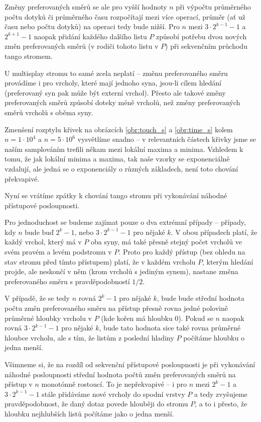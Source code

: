 Změny preferovaných směrů se ale pro vyšší hodnoty $n$ při výpočtu
průměrného počtu dotyků či průměrného času rozpočítají mezi více operací,
průměr (ať už času nebo počtu dotyků) na operaci tedy bude nižší. Pro $n$
 mezi $3\cdot 2^{k-1}-1$ a $2^{k+1}-1$ naopak přidání každého dalšího listu $P$ způsobí potřebu dvou nových změn preferovaných směrů (v rodiči tohoto listu v $P$) při sekvenčním průchodu tango stromem.

U multisplay stromu to samé zcela neplatí -- změnu preferovaného směru
provádíme i pro vrcholy, které mají jednoho syna, jsou-li cílem hledání
(preferovaný syn pak může být externí vrchol). Přesto ale takové změny
preferovaných směrů způsobí doteky méně vrcholů, než změny preferovaných směrů vrcholů s oběma syny.

Zmenšení rozptylu křivek na obrázcích \ref{obr:touch_s} a \ref{obr:time_s}
kolem $n=1\cdot 10^4$ a $n=5\cdot 10^6$ vysvětlíme snadno -- v relevantních
částech křivky jsme se naším samplováním trefili někam mezi lokální maxima a
minima. Vzhledem k tomu, že jak lokální minima a maxima, tak naše vzorky se
exponenciálně vzdalují, ale jedná se o exponenciály o různých základech, není
toto chování překvapivé.

Nyní se vrátíme zpátky k chování tango stromu při vykonávání náhodné přístupové
posloupnosti.

Pro jednoduchost se budeme zajímat pouze o dva extrémní případy --
případy, kdy $n$ bude buď $2^k-1$, nebo $3\cdot 2^{k-1} - 1$ pro nějaké $k$. V obou
případech platí, že každý vrchol, který má v $P$ oba syny, má také přesně
stejný počet vrcholů ve svém pravém a levém podstromu v $P$. Proto pro každý
přístup (bez ohledu na stav stromu před tímto přístupem) platí, že v každém
vrcholu $P$, kterým hledání projde, ale neskončí v něm (krom vrcholů s jediným
synem), nastane změna preferovaného směru s pravděpodobností $1/2$.

V případě, že se tedy $n$ rovná $2^k-1$ pro nějaké $k$, bude bude střední
hodnota počtu změn preferovaného směru na přístup přesně rovna jedné polovině
průměrné hloubky vrcholu v $P$ (kde kořen má hloubku 0). Pokud se $n$ naopak rovná
$3\cdot2^{k-1}-1$ pro nějaké $k$, bude tato hodnota sice také rovna průměrné
hloubce vrcholu, ale s tím, že listům z poslední hladiny $P$ počítáme hloubku o jedna menší.

Všimneme si, že na rozdíl od sekvenční přístupové posloupnosti je při vykonávání náhodné
posloupnosti střední hodnota počtů změn preferovaných směrů na přístup v $n$
monotónně rostoucí. To je nepřekvapivé -- i pro $n$ mezi $2^k-1$ a $3\cdot
2^{k-1}-1$ stále přidáváme nové vrcholy do spodní vrstvy $P$ a tedy zvyšujeme
pravděpodobnost, že daný dotaz povede hlouběji do stromu $P$, a to i přesto, že
hloubku nejhlubších listů počítáme jako o jedna menší.

